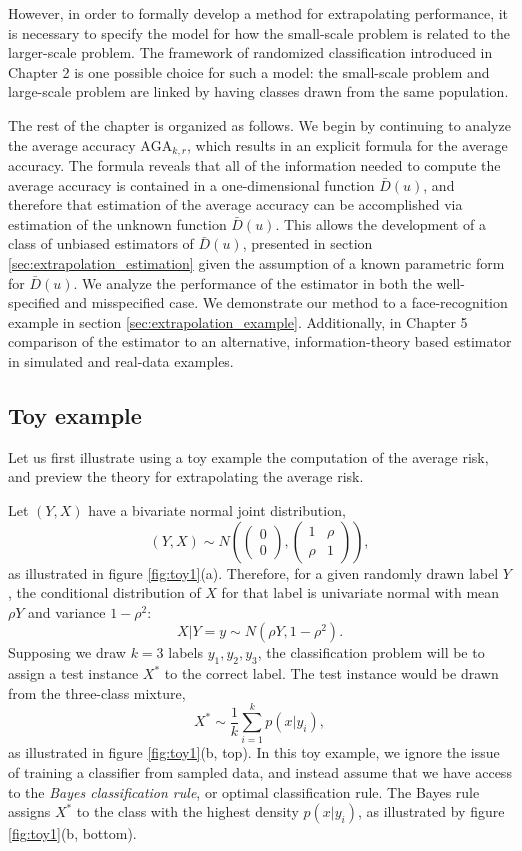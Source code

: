 \documentclass[12pt]{article}
\begin{document}
However, in order to formally develop a method for extrapolating
performance, it is necessary to specify the model for how the
small-scale problem is related to the larger-scale problem.  The
framework of randomized classification introduced in Chapter 2 is one
possible choice for such a model: the small-scale problem and
large-scale problem are linked by having classes drawn from the same
population.

The rest of the chapter is organized as follows.  We begin by
continuing to analyze the average accuracy $\text{AGA}_{k, r}$, which
results in an explicit formula for the average accuracy.  The formula
reveals that all of the information needed to compute the average
accuracy is contained in a one-dimensional function $\bar{D}(u)$, and
therefore that estimation of the average accuracy can be accomplished
via estimation of the unknown function $\bar{D}(u)$.  This allows the
development of a class of unbiased estimators of $\bar{D}(u)$,
presented in section \ref{sec:extrapolation_estimation} given the
assumption of a known parametric form for $\bar{D}(u)$.  We analyze
the performance of the estimator in both the well-specified and
misspecified case.  We demonstrate our method to a face-recognition
example in section \ref{sec:extrapolation_example}.  Additionally, in
Chapter 5 %
comparison of the estimator to an alternative, information-theory
based estimator in simulated and real-data examples.

\subsection{Toy example}

Let us first illustrate using a toy example the computation of the
average risk, and preview the theory for extrapolating the average
risk.

Let $(Y, X)$ have a bivariate normal joint distribution,
\[
(Y, X) \sim N\left(\begin{pmatrix}0 \\0\end{pmatrix}, \begin{pmatrix}1 & \rho \\ \rho & 1\end{pmatrix}\right),
\]
as illustrated in figure \ref{fig:toy1}(a).
Therefore, for a given randomly drawn label $Y$, the conditional
distribution of $X$ for that label is univariate normal with mean $\rho Y$ and variance $1-\rho^2$:
\[
X|Y = y \sim N(\rho Y, 1-\rho^2).
\]
Supposing we draw $k = 3$ labels $y_1,y_2, y_3$, the classification
problem will be to assign a test instance $X^*$ to the correct label.
The test instance would be drawn from the three-class mixture,
\[
X^* \sim \frac{1}{k}\sum_{i=1}^k p(x|y_i),
\]
as illustrated in figure \ref{fig:toy1}(b, top).  In this toy example, we
ignore the issue of training a classifier from sampled data, and
instead assume that we have access to the \emph{Bayes classification
rule}, or optimal classification rule.  The Bayes rule assigns $X^*$
to the class with the highest density $p(x|y_i)$, as illustrated by
figure \ref{fig:toy1}(b, bottom).
\end{document}
